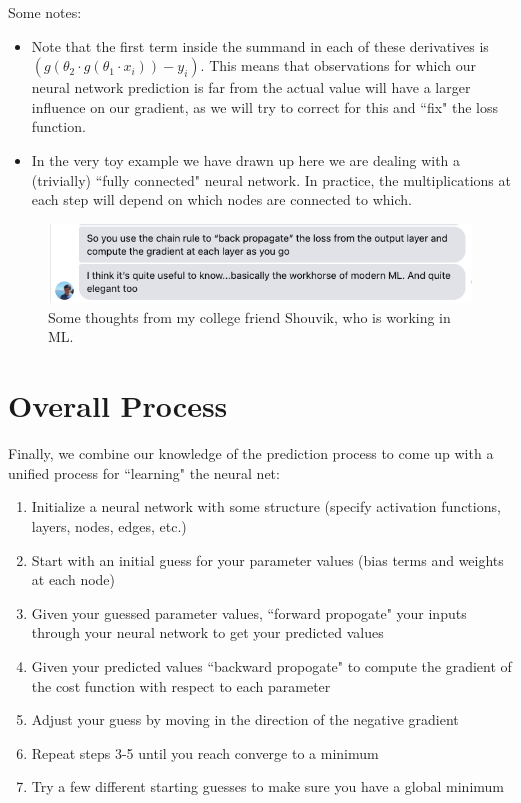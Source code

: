 \documentclass[10pt]{article}
\begin{document}
Some notes:
\begin{itemize}
	\item Note that the first term inside the summand in each of these derivatives is \(\left(g\left(\theta_2\cdot g(\theta_1\cdot x_i)\right)-y_i\right)\). This means that observations for which our neural network prediction is far from the actual value will have a larger influence on our gradient, as we will try to correct for this and ``fix" the loss function.
	\item In the very toy example we have drawn up here we are dealing with a (trivially) ``fully connected" neural network. In practice, the multiplications at each step will depend on which nodes are connected to which. 
\end{itemize}
\begin{figure}[htpb]
	\centering
	\includegraphics[width=0.8\linewidth]{shouvik.png}
	\caption{Some thoughts from my college friend Shouvik, who is working in ML.}%
	\label{fig:shouvik}
\end{figure}

\section{Overall Process}%
\label{sec:overall}

Finally, we combine our knowledge of the prediction process to come up with a unified process for ``learning" the neural net:
\begin{enumerate}
	\item Initialize a neural network with some structure (specify activation functions, layers, nodes, edges, etc.)
	\item Start with an initial guess for your parameter values (bias terms and weights at each node)
	\item Given your guessed parameter values, ``forward propogate" your inputs through your neural network to get your predicted values
	\item Given your predicted values ``backward propogate" to compute the gradient of the cost function with respect to each parameter
	\item Adjust your guess by moving in the direction of the negative gradient
	\item Repeat steps 3-5 until you reach converge to a minimum
	\item Try a few different starting guesses to make sure you have a global minimum
 \end{enumerate}
\end{document}
